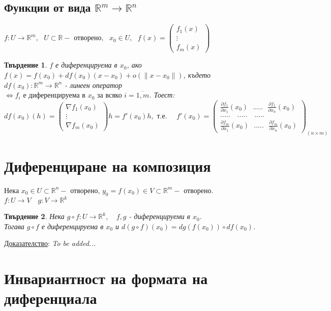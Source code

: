 \documentclass[12pt]{article}
\newtheorem{proposition}{Твърдение}
\newcommand{\spc}{\text{ }}
\begin{document}
	\subsection*{Функции от вида $\mathbb{R}^m \rightarrow \mathbb{R}^n$}
	\begin{math}
		f: U \rightarrow \mathbb{R}^m, \spc U\subset \mathbb{R} - \text{ отворено}, \spc x_0\in U,
		\spc f(x) = \begin{pmatrix}
						f_1(x) \\
						\vdots \\
						f_m(x)
					\end{pmatrix}
	\end{math}
	\begin{proposition}
		$f$ е диференцируема в $x_0$, ако $f(x) = f(x_0) + df(x_0)(x-x_0) + o(\|x-x_0\|)$, където $ df(x_0):\mathbb{R}^m \rightarrow \mathbb{R}^n$ - линеен оператор $\Leftrightarrow f_i \text{ е диференцируема в } x_0 \text{ за всяко } i = \overline{1, m}$. Тоест:\\
		\begin{math}
		df(x_0)(h) =
			\begin{pmatrix}
				\nabla f_1(x_0) \\
				\vdots \\
				\nabla f_m(x_0)
			\end{pmatrix} h = f'(x_0)h, \text{ т.е. } \quad
		f'(x_0) = 
			\begin{pmatrix}
				\frac{\partial f_1}{\partial x_1}(x_0)
				\spc ..... \spc
				\frac{\partial f_1}{\partial x_n}(x_0)
				\\
				..... \quad ..... \quad .....
				\\
				\frac{\partial f_m}{\partial x_1}(x_0)
				\spc ..... \spc
				\frac{\partial f_m}{\partial x_n}(x_0)
			\end{pmatrix}_{(n \times m)}
		\end{math}
	\end{proposition}
	
	\section*{Диференциране на композиция}
	Нека $x_0 \in U \subset \mathbb{R}^n - $ отворено, 
	\quad $y_0 = f(x_0)\in V\subset \mathbb{R}^m - $ отворено.\\
	$f:U\rightarrow V \quad  g:V\rightarrow \mathbb{R}^k$
	\begin{proposition}
		Нека $g \circ f : U \rightarrow \mathbb{R}^k, \spc$
		$f, g$ - диференцируеми в $x_0$. \\
		Тогава $g \circ f$ е диференцируема в $x_0$ и $d(g\circ f)(x_0) = dg(f(x_0))\circ df(x_0)$. 
	\end{proposition}
	\underline{Доказателство}:
	\textit{To be added...}\\
	
	\section*{Инвариантност на формата на диференциала}
\end{document}
